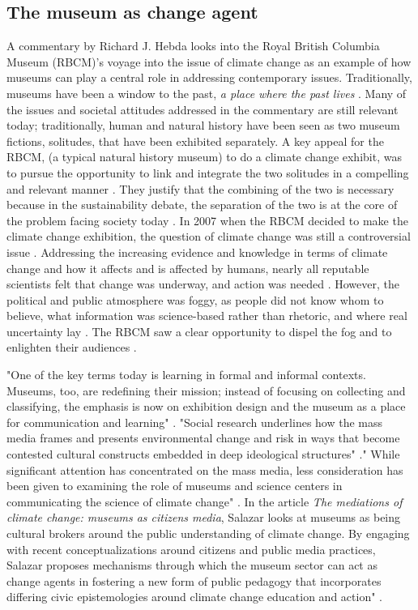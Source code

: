 \subsection{The museum as change agent}
A commentary by Richard J. Hebda looks into the Royal British Columbia Museum (RBCM)’s voyage into the issue of climate change as an example of how museums can play a central role in addressing contemporary issues. Traditionally, museums have been a window to the past, \emph{a place where the past lives} \autocite[p. 1]{hebda_article}. Many of the issues and societal attitudes addressed in the commentary are still relevant today; traditionally, human and natural history have been seen as two museum fictions, solitudes, that have been exhibited separately. A key appeal for the RBCM, (a typical natural history museum) to do a climate change exhibit, was to pursue the opportunity to link and integrate the two solitudes in a compelling and relevant manner \autocite[p. 2]{hebda_article}. They justify that the combining of the two is necessary because in the sustainability debate, the separation of the two is at the core of the problem facing society today \autocite[p.2]{hebda_article}. In 2007 when the RBCM decided to make the climate change exhibition, the question of climate change was still a controversial issue \autocite[p.2]{hebda_article}. Addressing the increasing evidence and knowledge in terms of climate change and how it affects and is affected by humans, nearly all reputable scientists felt that change was underway, and action was needed \autocite[p.2]{hebda_article}. However, the political and public atmosphere was foggy, as people did not know whom to believe, what information was science-based rather than rhetoric, and where real uncertainty lay \autocite[p.2]{hebda_article}. The RBCM saw a clear opportunity to dispel the fog and to enlighten their audiences \autocite[p.2]{hebda_article}.

"One of the key terms today is learning in formal and informal contexts. Museums, too, are redefining their mission; instead of focusing on collecting and classifying, the emphasis is now on exhibition design and the museum as a place for communication and learning" \autocite[p. 8]{insulander_designs_2009}. "Social research underlines how the mass media frames and presents environmental change and risk in ways that become contested cultural constructs embedded in deep ideological structures" \autocite[p. 1]{salazar_mediations_2011}." While significant attention has concentrated on the mass media, less consideration has been given to examining the role of museums and science centers in communicating the science of climate change" \autocite[p. 1]{salazar_mediations_2011}. In the article \emph{The mediations of climate change: museums as citizens media}, Salazar looks at museums as being cultural brokers around the public understanding of climate change. By engaging with recent conceptualizations around citizens and public media practices, Salazar proposes mechanisms through which the museum sector can act as change agents in fostering a new form of public pedagogy that incorporates differing civic epistemologies around climate change education and action" \autocite[p. 1]{salazar_mediations_2011}.


